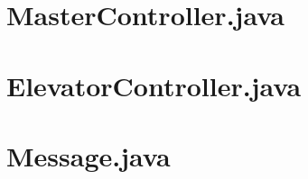 \appendix

\begin{comment}
\section{README}
\label{code:readme}


\section{Makefile}
\label{code:makefile}


\end{comment}
\section{MasterController.java}
\label{code:master}


\section{ElevatorController.java}
\label{code:controller}


\section{Message.java}
\label{code:message}

